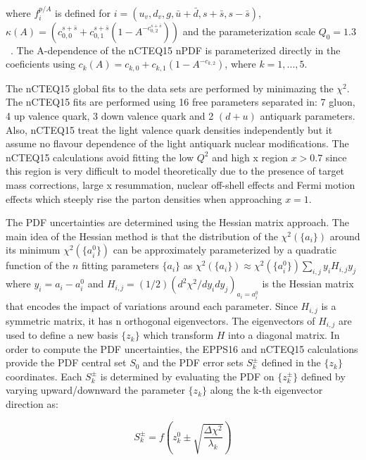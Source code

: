 where $f_{i}^{p/A}$ is defined for $i = \left(u_{v} , d_{v} , g , \bar{u}+\bar{d} , s+\bar{s} , s-\bar{s}\right)$, $\kappa\left(A\right)=\left(c^{s+\bar{s}}_{0,0} + c^{s+\bar{s}}_{0,1}\left(1-A^{-c^{s+\bar{s}}_{0,2}}\right)\right)$ and the parameterization scale $Q_{0}=1.3$~\GeV. The A-dependence of the nCTEQ15 nPDF is parameterized directly in the coeficients using $c_{k}\left(A\right) = c_{k,0} + c_{k,1}\left(1-A^{-c_{k,2}}\right)$, where $k=1,...,5$.

The nCTEQ15 global fits to the data sets are performed by minimazing the $\chi^{2}$. The nCTEQ15 fits are performed using 16 free parameters separated in: 7 gluon, 4 up valence quark, 3 down valence quark and 2 $\left(d+u\right)$ antiquark parameters. Also, nCTEQ15 treat the light valence quark densities independently but it assume no flavour dependence of the light antiquark nuclear modifications. The nCTEQ15 calculations avoid fitting the low $Q^{2}$ and high x region $x>0.7$ since this region is very difficult to model theoretically due to the presence of target mass corrections, large x resummation, nuclear off-shell effects and Fermi motion effects which steeply rise the parton densities when approaching $x=1$.

The PDF uncertainties are determined using the Hessian matrix approach. The main idea of the Hessian method is that the distribution of the $\chi^{2}\left(\{a_{i}\}\right)$ around its minimum $\chi^{2}\left(\{a^{0}_{i}\}\right)$ can be approximately parameterized by a quadratic function of the $n$ fitting parameters $\{a_{i}\}$ as $\chi^{2}\left(\{a_{i}\}\right)\approx{\chi^{2}\left(\{a^{0}_{i}\}\right)}\sum_{i,j}y_{i}H_{i,j}y_{j}$ where $y_{i}=a_{i}-a_{i}^{0}$ and $H_{i,j}=\left(1/2\right)\left(d^{2}\chi^{2}/dy_{i}dy_{j}\right)_{a_{i}=a_{i}^{0}}$ is the Hessian matrix that encodes the impact of variations around each parameter. Since $H_{i,j}$ is a symmetric matrix, it has n orthogonal eigenvectors. The eigenvectors of $H_{i,j}$ are used to define a new basis $\{z_{k}\}$ which  transform $H$ into a diagonal matrix. In order to compute the PDF uncertainties, the EPPS16 and nCTEQ15 calculations provide the PDF central set $S_{0}$ and the PDF error sets $S^{\pm}_{k}$ defined in the $\{z_{k}\}$ coordinates. Each $S^{\pm}_{k}$ is determined by evaluating the PDF on $\{z^{\pm}_{k}\}$ defined by varying upward/downward the parameter $\{z_{k}\}$ along the k-th eigenvector direction as:

\begin{equation}
  S^{\pm}_{k} = f\left(z^{0}_{k} \pm \sqrt{\frac{\Delta{\chi^{2}}}{\lambda_{k}}}\right)
\end{equation}

